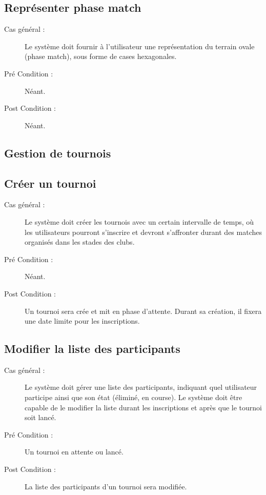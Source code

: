 \documentclass[a4paper]{report}
\begin{document}
\subsection{Représenter phase match}
\begin{description}
    \item[Cas général :] Le système doit fournir à l'\gls{utilisateur} une représentation du terrain ovale (phase match), sous forme de cases hexagonales.
    \item[Pré Condition  :] Néant.
    \item[Post Condition :] Néant.
\end{description}

\subsection{Gestion de tournois}
\subsection{Créer un tournoi}
\begin{description}
    \item[Cas général :] Le système doit créer les tournois avec un certain intervalle de temps, où les \glspl{utilisateur} pourront s'inscrire et devront s'affronter durant des matches organisés dans les stades des \glspl{club}.
    \item[Pré Condition  :] Néant.
    \item[Post Condition :] Un tournoi sera crée et mit en phase d'attente.
        Durant sa création, il fixera une date limite pour les inscriptions.
\end{description}

\subsection{Modifier la liste des \glspl{participant}}
\begin{description}
    \item[Cas général :] Le système doit gérer une liste des \glspl{participant}, indiquant quel \gls{utilisateur} participe ainsi que son état (éliminé, en course). Le système doit être capable de le modifier la liste durant les inscriptions et après que le tournoi soit lancé.
    \item[Pré Condition  :] Un tournoi en attente ou lancé.
    \item[Post Condition :] La liste des \glspl{participant} d'un tournoi sera modifiée.
\end{description}
\end{document}
